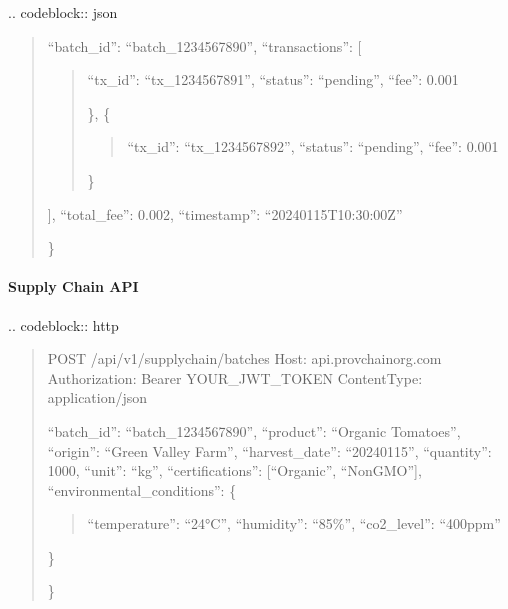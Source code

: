 \documentclass[letterpaper,10pt,english]{sphinxmanual}
\begin{document}
\sphinxAtStartPar
{}
.. code\sphinxhyphen{}block:: json
\begin{quote}
\begin{description}
\sphinxlineitem{\{}
\sphinxAtStartPar
“batch\_id”: “batch\_1234567890”,
“transactions”: {[}
\begin{quote}
\begin{description}
\sphinxlineitem{\{}
\sphinxAtStartPar
“tx\_id”: “tx\_1234567891”,
“status”: “pending”,
“fee”: 0.001

\end{description}

\sphinxAtStartPar
\},
\{
\begin{quote}

\sphinxAtStartPar
“tx\_id”: “tx\_1234567892”,
“status”: “pending”,
“fee”: 0.001
\end{quote}

\sphinxAtStartPar
\}
\end{quote}

\sphinxAtStartPar
{]},
“total\_fee”: 0.002,
“timestamp”: “2024\sphinxhyphen{}01\sphinxhyphen{}15T10:30:00Z”

\end{description}

\sphinxAtStartPar
\}
\end{quote}


\paragraph{Supply Chain API}
\label{\detokenize{api/index:supply-chain-api}}
\sphinxAtStartPar
{}
.. code\sphinxhyphen{}block:: http
\begin{quote}

\sphinxAtStartPar
POST /api/v1/supply\sphinxhyphen{}chain/batches
Host: api.provchain\sphinxhyphen{}org.com
Authorization: Bearer YOUR\_JWT\_TOKEN
Content\sphinxhyphen{}Type: application/json
\begin{description}
\sphinxlineitem{\{}
\sphinxAtStartPar
“batch\_id”: “batch\_1234567890”,
“product”: “Organic Tomatoes”,
“origin”: “Green Valley Farm”,
“harvest\_date”: “2024\sphinxhyphen{}01\sphinxhyphen{}15”,
“quantity”: 1000,
“unit”: “kg”,
“certifications”: {[}“Organic”, “Non\sphinxhyphen{}GMO”{]},
“environmental\_conditions”: \{
\begin{quote}

\sphinxAtStartPar
“temperature”: “2\sphinxhyphen{}4°C”,
“humidity”: “85\%”,
“co2\_level”: “400ppm”
\end{quote}

\sphinxAtStartPar
\}

\end{description}

\sphinxAtStartPar
\}
\end{quote}
\end{document}
